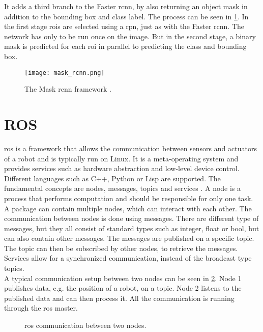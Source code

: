 It adds a third branch to the Faster \gls{rcnn}, by also returning an object mask in addition to the bounding box and class label.
The process can be seen in \cref{fig:mask_rcnn}.
In the first stage \glspl{roi} are selected using a \gls{rpn}, just as with the Faster \gls{rcnn}.
The network has only to be run once on the image.
But in the second stage, a binary mask is predicted for each \gls{roi} in parallel to predicting the class and bounding box.
\begin{figure}[htbp]
	\centering
	\texttt{[image: mask\_rcnn.png]}
	\caption[Mask \acrshort{rcnn} framework]{The Mask \acrshort{rcnn} framework \cite{He2017}.}
	\label{fig:mask_rcnn}
\end{figure}



\section{ROS}
\label{sec:ros}
\gls{ros} is a framework that allows the communication between sensors and actuators of a robot and is typically run on Linux.
It is a meta-operating system and provides services such as hardware abstraction and low-level device control.
Different languages such as C++, Python or Lisp are supported.
The fundamental concepts are nodes, messages, topics and services \cite{Quigley2009}.
A node is a process that performs computation and should be responsible for only one task.
A package can contain multiple nodes, which can interact with each other.
The communication between nodes is done using messages.
There are different type of messages, but they all consist of standard types such as integer, float or bool, but can also contain other messages.
The messages are published on a specific topic.
The topic can then be subscribed by other nodes, to retrieve the messages.
Services allow for a synchronized communication, instead of the broadcast type topics.\\
A typical communication setup between two nodes can be seen in \cref{fig:ros_framework}.
Node 1 publishes data, e.g. the position of a robot, on a topic.
Node 2 listens to the published data and can then process it.
All the communication is running through the \gls{ros} master.
\begin{figure}[htb]
	\centering
	
	\caption[\acrshort{ros} communication]{\acrshort{ros} communication between two nodes.}
	\label{fig:ros_framework}
\end{figure}